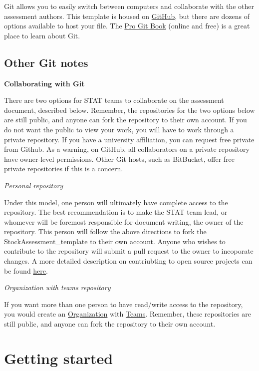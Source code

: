 \documentclass[12pt,]{article}
\begin{document}
Git allows you to easily switch between computers and collaborate with
the other assessment authors. This template is housed on
\href{https://github.com/}{GitHub}, but there are dozens of options
available to host your file. The
\href{http://git-scm.com/book/en/v2}{Pro Git Book} (online and free) is
a great place to learn about Git.

\subsection{Other Git notes}\label{other-git-notes}

\textbf{Collaborating with Git}

There are two options for STAT teams to collaborate on the assessment
document, described below. Remember, the repositories for the two
options below are still public, and anyone can fork the repository to
their own account. If you do not want the public to view your work, you
will have to work through a private repository. If you have a university
affiliation, you can request free private from Github. As a warning, on
GitHub, all collaborators on a private repository have owner-level
permissions. Other Git hosts, such as BitBucket, offer free private
repositories if this is a concern.

\emph{Personal repository}

Under this model, one person will ultimately have complete access to the
repository. The best recommendation is to make the STAT team lead, or
whomever will be foremost responsible for document writing, the owner of
the repository. This person will follow the above directions to fork the
StockAssessment\_template to their own account. Anyone who wishes to
contribute to the repository will submit a pull request to the owner to
incoporate changes. A more detailed description on contriubting to open
source projects can be found
\href{https://guides.github.com/activities/contributing-to-open-source/}{here}.

\emph{Organization with teams repository}

If you want more than one person to have read/write access to the
repository, you would create an
\href{https://help.github.com/articles/creating-a-new-organization-account/}{Organization}
with
\href{https://help.github.com/articles/permission-levels-for-an-organization-repository/}{Teams}.
Remember, these repositories are still public, and anyone can fork the
repository to their own account.

\section{Getting started}\label{getting-started}
\end{document}
